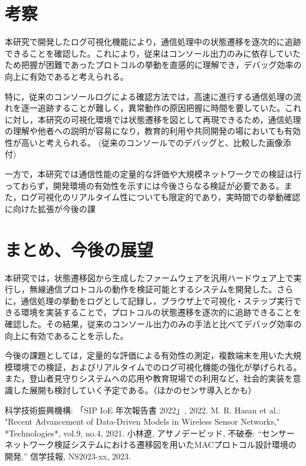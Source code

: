 \documentclass[paper]{ieicej}
\begin{document}
\section{考察}
本研究で開発したログ可視化機能により，通信処理中の状態遷移を逐次的に追跡できることを確認した。これにより，従来はコンソール出力のみに依存していたため把握が困難であったプロトコルの挙動を直感的に理解でき，デバッグ効率の向上に有効であると考えられる。

特に，従来のコンソールログによる確認方法では，高速に進行する通信処理の流れを逐一追跡することが難しく，異常動作の原因把握に時間を要していた。これに対し，本研究の可視化環境では状態遷移を図として再現できるため，通信処理の理解や他者への説明が容易になり，教育的利用や共同開発の場においても有効性が高いと考えられる。
(従来のコンソールでのデバッグと、比較した画像添付)

一方で，本研究では通信性能の定量的な評価や大規模ネットワークでの検証は行っておらず，開発環境の有効性を示すには今後さらなる検証が必要である。また，ログ可視化のリアルタイム性についても限定的であり，実時間での挙動確認に向けた拡張が今後の課


\section{まとめ、今後の展望}
本研究では，状態遷移図から生成したファームウェアを汎用ハードウェア上で実行し，無線通信プロトコルの動作を検証可能とするシステムを開発した。さらに，通信処理の挙動をログとして記録し，ブラウザ上で可視化・ステップ実行できる環境を実装することで，プロトコルの状態遷移を逐次的に追跡できることを確認した。その結果，従来のコンソール出力のみの手法と比べてデバッグ効率の向上に有効であることを示した。

今後の課題としては，定量的な評価による有効性の測定，複数端末を用いた大規模環境での検証，およびリアルタイムでのログ可視化機能の強化が挙げられる。また，登山者見守りシステムへの応用や教育現場での利用など，社会的実装を意識した展開も検討していく予定である。（ほかのセンサ導入とかも）


\baselineskip
%
%

\begin{thebibliography}{99}
 科学技術振興機構: 「SIP IoE 年次報告書 2022」, 2022.
 M. R. Hasan et al.: "Recent Advancement of Data-Driven Models in Wireless Sensor Networks," *Technologies*, vol.9, no.4, 2021.
 小林遼, アサノデービッド, 不破泰:
“センサーネットワーク検証システムにおける遷移図を用いたMACプロトコル設計環境の開発,”
信学技報, NS2023-xx, 2023.

\end{thebibliography}

\appendix
\section{}
\end{document}
